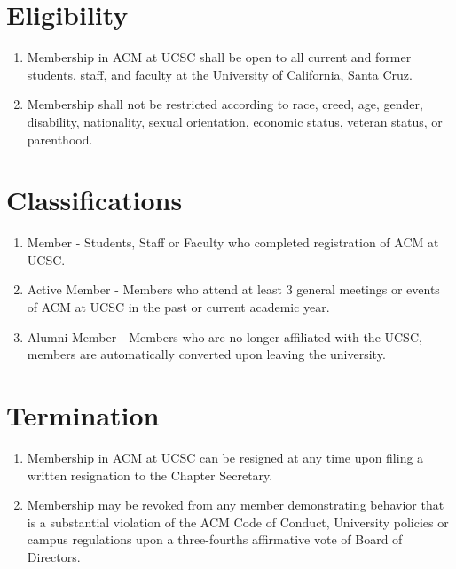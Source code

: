 
\section{Eligibility}
\begin{enumerate}
	\item Membership in ACM at UCSC shall be open to all current and former students, staff, and faculty at the University of California, Santa Cruz.
	\item Membership shall not be restricted according to race, creed, age, gender, disability, nationality, sexual orientation, economic status, veteran status, or parenthood.
\end{enumerate}

\section{Classifications}
\begin{enumerate}
	\item Member - Students, Staff or Faculty who completed registration of ACM at UCSC.
	\item Active Member - Members who attend at least 3 general meetings or events of ACM at UCSC in the past or current academic year.
	\item Alumni Member - Members who are no longer affiliated with the UCSC, members are automatically converted upon leaving the university.
\end{enumerate}

\section{Termination}
\begin{enumerate}
	\item Membership in ACM at UCSC can be resigned at any time upon filing a written resignation to the Chapter Secretary.
	\item Membership may be revoked from any member demonstrating behavior that is a substantial violation of the ACM Code of Conduct, University policies or campus regulations upon a three-fourths affirmative vote of Board of Directors.
\end{enumerate}

\newpage
